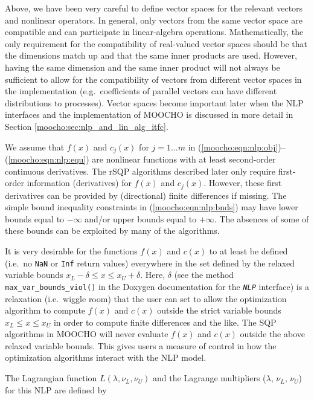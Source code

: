 \documentclass[pdf,12pt,report]{SANDreport}
\begin{document}
Above, we have been very careful to define vector spaces for the relevant
vectors and nonlinear operators.  In general, only vectors from the same
vector space are compatible and can participate in linear-algebra operations.
Mathematically, the only requirement for the compatibility of real-valued
vector spaces should be that the dimensions match up and that the same inner
products are used.  However, having the same dimension and the same inner
product will not always be sufficient to allow for the compatibility of
vectors from different vector spaces in the implementation (e.g.\ coefficients
of parallel vectors can have different distributions to processes).  Vector
spaces become important later when the NLP interfaces and the implementation
of MOOCHO is discussed in more detail in Section
{}\ref{moocho:sec:nlp_and_lin_alg_itfc}.

We assume that $f(x)$ and $c_j(x)$ for $j = 1 \ldots m$ in
(\ref{moocho:eqn:nlp:obj})--(\ref{moocho:eqn:nlp:equ}) are nonlinear functions
with at least second-order continuous derivatives.  The rSQP algorithms
described later only require first-order information (derivatives) for $f(x)$
and $c_j(x)$.  However, these first derivatives can be provided by
(directional) finite differences if missing.  The simple bound inequality
constraints in (\ref{moocho:eqn:nlp:bnds}) may have lower bounds equal to
$-\infty$ and/or upper bounds equal to $+\infty$.  The absences of some of
these bounds can be exploited by many of the algorithms.

It is very desirable for the functions $f(x)$ and $c(x)$ to at least be
defined (i.e.\ no {}\texttt{NaN} or {}\texttt{Inf} return values) everywhere
in the set defined by the relaxed variable bounds $x_L - \delta \leq x \leq
x_U +
{}\delta$.  Here, $\delta$ (see the method
{}\texttt{max\_var\_bounds\_viol()} in the Doxygen documentation for the
{}\texttt{\textit{NLP}} interface) is a relaxation (i.e.\ wiggle room)
that the user can set to allow the optimization algorithm to compute
$f(x)$ and $c(x)$ outside the strict variable bounds $x_L \le x \le
x_U$ in order to compute finite differences and the like.  The SQP
algorithms in MOOCHO will never evaluate $f(x)$ and $c(x)$ outside the
above relaxed variable bounds.  This gives users a measure of control
in how the optimization algorithms interact with the NLP model.

The Lagrangian function $L(\lambda, \nu_L, \nu_U)$ and the Lagrange
multipliers ($\lambda$, $\nu_L$, $\nu_U$) for this NLP are defined by
\end{document}
